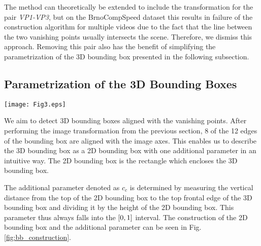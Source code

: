 \documentclass[twocolumn]{svjour3}          \smartqed  \usepackage{graphicx}
\begin{document}
The method can theoretically be extended to include the transformation for the pair \textit{VP1-VP3}, but on the BrnoCompSpeed dataset this results in failure of the construction algorithm for multiple videos due to the fact that the line between the two vanishing points usually intersects the scene. Therefore, we dismiss this approach. Removing this pair also has the benefit of simplifying the parametrization of the 3D bounding box presented in the following subsection.

\subsection{Parametrization of the 3D Bounding Boxes}

\begin{figure*}[t]
   \centering
   \texttt{[image: Fig3.eps]}
   \caption{The process of constructing 2D bounding box with the $c_c$ parameter from a 3D bounding box using the transformation for both pairs for a vehicle from the BoxCars dataset \cite{boxcars}. \textbf{a)} 3D bounding box (green) which is aligned with \textit{VP1} (yellow), \textit{VP2} (blue) and \textit{VP3} (red). \textbf{b)} 3D bounding box. \textbf{c)} 3D bouding box after the perspective transform for the pair \textit{VP2-VP3} is applied. \textbf{d)} The parametrization of the 3D bouding box for the pair \textit{VP2-VP3} as a 2D bouding box (green) with the parameter $c_c$ is determined as the ratio of the distance from top of the 2D bounding box to the top-front edge of the transformed 3D bounding box (blue) and the height of the 2D bouding box. \textbf{e)} 3D bouding box after the perspective transform for the pair \textit{VP1-VP2} is applied. \textbf{f)} The parametrization of the 3D bouding box for the pair \textit{VP1-VP2}.}
   \label{fig:bb_construction}
\end{figure*}

We aim to detect 3D bounding boxes aligned with the vanishing points. After performing the image transformation from the previous section, 8 of the 12 edges of the bounding box are aligned with the image axes. This enables us to describe the 3D bounding box as a 2D bounding box with one additional parameter in an intuitive way. The 2D bounding box is the rectangle which encloses the 3D bounding box. 

The additional parameter denoted as $c_c$ is determined by measuring the vertical distance from the top of the 2D bounding box to the top frontal edge of the 3D bounding box and dividing it by the height of the 2D bounding box. This parameter thus always falls into the $\interval{0}{1}$ interval. The construction of the 2D bounding box and the additional parameter can be seen in Fig. \ref{fig:bb_construction}.
\end{document}
